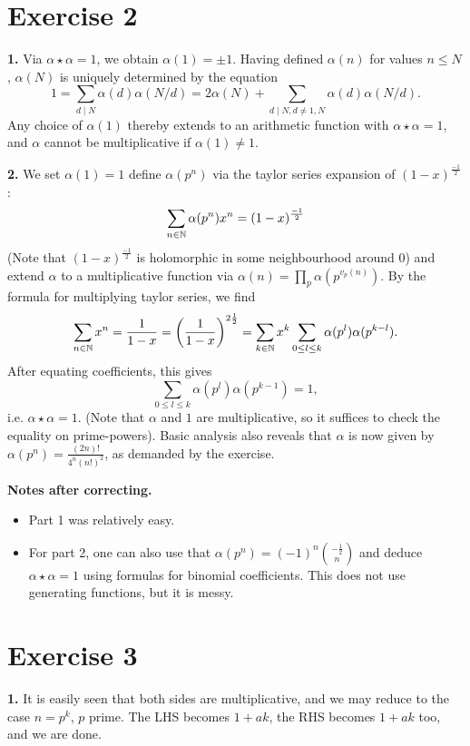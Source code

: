 \documentclass[a4paper,11pt]{article}
\begin{document}
\section*{Exercise 2}
\textbf{1.} 
Via $\alpha \star \alpha = 1$, we obtain $\alpha(1) = \pm 1$. Having defined 
$\alpha(n)$ for values $n \leq N$, $\alpha(N)$ is uniquely determined by the equation
$$1 = \sum_{d \mid N} \alpha(d)\alpha(N/d) = 2 \alpha(N) + \sum_{d \mid N, d
\neq 1, N} \alpha(d) \alpha(N/d).$$
Any choice of $\alpha(1)$ thereby extends to an arithmetic function with
$\alpha \star \alpha  = 1$, and $\alpha$ cannot be multiplicative if $\alpha(1)
\neq 1$. 

\textbf{2.} 
We set $\alpha(1) = 1$ define $\alpha(p^n)$ via the taylor series expansion of
$(1-x)^{\frac{-1}2}$:
\[
    \sum_{n \in \mathbb{N}} \alpha(p^n) x^n = (1-x)^{\frac{-1}2}
\]
(Note that $(1-x)^{\frac{-1}2}$ is holomorphic in some neighbourhood around $0$) 
and extend $\alpha$ to a multiplicative function via $\alpha(n) = \prod_{p}
\alpha(p^{v_p(n)})$. By the formula for multiplying taylor series, we find 
\[
    \sum_{n \in \mathbb{N}} x^n = \frac{1}{1-x} = \left( \frac{1}{1-x} \right)^{2 \frac 12}
    = \sum_{k \in \mathbb{N}}x^k \sum_{0 \leq l \leq k} \alpha(p^l) \alpha(p^{k-l}).
\]
After equating coefficients, this gives
\[
    \sum_{0 \leq l \leq k} \alpha(p^l) \alpha(p^{k-1}) = 1,
\]
i.e. $\alpha \star \alpha = 1$. (Note that $\alpha$ and $1$ are multiplicative, so it suffices
to check the equality on prime-powers). 
Basic analysis also reveals that $\alpha$ is now given by $\alpha(p^n) =
\frac{(2n)!}{4^n(n!)^2}$, as demanded by the exercise.

\textbf{Notes after correcting.} \leavevmode
\begin{itemize}
    \item Part 1 was relatively easy.
    \item For part 2, one can also use that $\alpha(p^n) = (-1)^n\binom{-\frac 12}{n}$ and
        deduce $\alpha \star \alpha = 1$ using formulas for binomial
        coefficients. This does not use generating functions, but it is messy. 
\end{itemize}

\section*{Exercise 3}
\textbf{1.} It is easily seen that both sides are multiplicative, and we may reduce to 
the case $n = p^k$, $p$ prime. The LHS becomes $1+ak$, the RHS becomes $1+ak$
too, and we are done.
\end{document}
